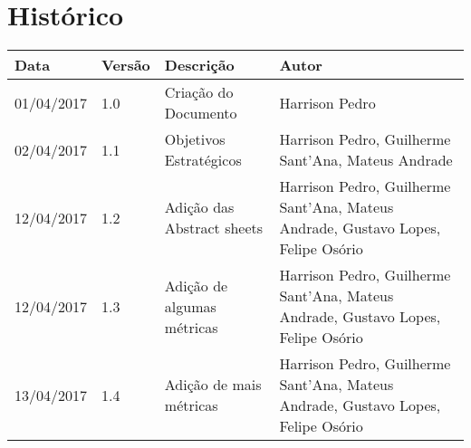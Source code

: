 \chapter{Histórico}

\begin{tabular}{ |p{3cm}|p{3cm}|p{3cm}|p{3cm}|  }
 \hline
 Data 		& 		Versão & 		Descrição 			& 		Autor\\
 \hline\hline
 01/04/2017 & 		1.0    &		Criação do Documento &   	Harrison Pedro \\ 
 \hline
 02/04/2017 & 		1.1    &		Objetivos Estratégicos &   	Harrison Pedro, Guilherme Sant'Ana, Mateus Andrade \\ 
 \hline
 12/04/2017 & 		1.2    &		Adição das Abstract sheets  &   	Harrison Pedro, Guilherme Sant'Ana, Mateus Andrade, Gustavo Lopes, Felipe Osório \\ 
 \hline
 12/04/2017 & 		1.3    &		Adição de algumas métricas  &   	Harrison Pedro, Guilherme Sant'Ana, Mateus Andrade, Gustavo Lopes, Felipe Osório \\ 
 \hline
 13/04/2017 & 		1.4    &		Adição de mais métricas  &   	Harrison Pedro, Guilherme Sant'Ana, Mateus Andrade, Gustavo Lopes, Felipe Osório \\ 
 \hline

\end{tabular}

